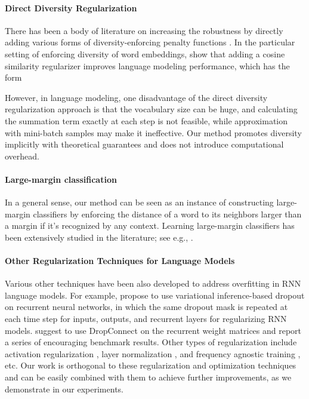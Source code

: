 \documentclass{article}
\begin{document}
\paragraph{Direct Diversity Regularization}  There has been a body of literature on
increasing the robustness by 
directly 
adding various forms of diversity-enforcing penalty functions \citep[e.g.,][]{elsayed2018large, xie2016diverse, liu2016large, liu2017sphereface, chen2017noisy, wang2018additive}. In the particular setting of enforcing diversity of word embeddings, 
\citet{gao2018representation} show 
that adding a cosine similarity regularizer improves language modeling performance, which has the form 

However, in language modeling, 
one disadvantage of the direct diversity regularization approach  is that 
the vocabulary size  can be huge, and
calculating the summation term exactly at each step is not feasible, while 
approximation with mini-batch samples may  make it ineffective. Our method promotes diversity implicitly with theoretical guarantees and does not introduce  computational overhead. 






\paragraph{Large-margin classification}
In a general sense, our method can be seen as an instance of
 constructing
 large-margin classifiers by enforcing the distance of a word to its neighbors larger than a margin if it's recognized by any context.
Learning large-margin classifiers has been extensively studied in the literature; 
 see e.g., \citet{weston1999support, tsochantaridis2005large, jiang2018predicting, elsayed2018large, liu2016large, liu2017sphereface}. 



\paragraph{Other Regularization Techniques for  
Language Models} 
Various other techniques have been also developed to address overfitting in RNN language models. 
For example, 
\citet{gal2016theoretically} propose to use variational inference-based dropout 
\citep{srivastava2014dropout} on recurrent neural networks, 
 in which the same dropout mask
 is repeated  at each time step for inputs, outputs, and recurrent layers  
for regularizing RNN models.  
\citet{merity2017regularizing} suggest to use DropConnect \citep{wan2013regularization} 
on the recurrent weight matrices and report a series of encouraging benchmark results.
Other types of regularization include 
activation regularization \citep{merity2017revisiting},
layer normalization \citep{ba2016layer}, 
and frequency agnostic training \citep{gong2018frage}, etc.
Our work is orthogonal to these regularization and optimization techniques
and can be easily combined with them to achieve further improvements, as we demonstrate in our experiments. 
\end{document}
